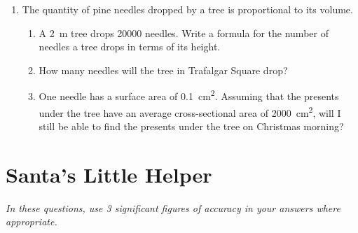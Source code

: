 \documentclass{article}
\begin{document}
\begin{enumerate}
\item The quantity of pine needles dropped by a tree is proportional to its volume.

\begin{enumerate}
\item A \SI{2}{m} tree drops \num{20000} needles.
Write a formula for the number of needles a tree drops in terms of its height.

\item How many needles will the tree in Trafalgar Square drop?

\item One needle has a surface area of \SI{.1}{cm^2}.
Assuming that the presents under the tree have an average cross-sectional area of \SI{2000}{cm^2}, will I still be able to find the presents under the tree on Christmas morning?
\end{enumerate}
\end{enumerate}

\newpage
\section{Santa's Little Helper}

\emph{In these questions, use \num{3} significant figures of accuracy in your answers where appropriate.}
\end{document}
